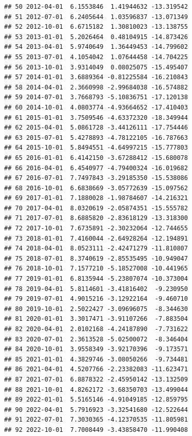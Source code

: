 \documentclass[
]{article}
\newenvironment{Shaded}{\begin{snugshade}}{\end{snugshade}}
\newcommand{\AttributeTok}[1]{\textcolor[rgb]{0.77,0.63,0.00}{#1}}
\newcommand{\FunctionTok}[1]{\textcolor[rgb]{0.00,0.00,0.00}{#1}}
\newcommand{\NormalTok}[1]{#1}
\newcommand{\SpecialCharTok}[1]{\textcolor[rgb]{0.00,0.00,0.00}{#1}}
\newcommand{\StringTok}[1]{\textcolor[rgb]{0.31,0.60,0.02}{#1}}
\begin{document}
\begin{verbatim}
## 50 2012-04-01  6.1553846  1.41944632 -13.319542
## 51 2012-07-01  6.2405644  1.03596837 -13.071349
## 52 2012-10-01  6.6715182  1.30810023 -13.138755
## 53 2013-01-01  5.2026464  0.48104915 -14.873426
## 54 2013-04-01  5.9740649  1.36449453 -14.799602
## 55 2013-07-01  4.1054042  1.07644458 -14.704225
## 56 2013-10-01  3.9314049  0.08025075 -15.495407
## 57 2014-01-01  3.6889364 -0.81225584 -16.210843
## 58 2014-04-01  2.3660998 -2.99684038 -16.574882
## 59 2014-07-01  3.7668793 -5.10836751 -17.120138
## 60 2014-10-01  4.0803774 -4.93664652 -17.410403
## 61 2015-01-01  3.7509546 -4.63372320 -18.349944
## 62 2015-04-01  5.0861728 -3.44126111 -17.754446
## 63 2015-07-01  5.4278893 -4.78122105 -16.787663
## 64 2015-10-01  5.8494551 -4.64997215 -15.777803
## 65 2016-01-01  6.4142150 -3.67288412 -15.680078
## 66 2016-04-01  6.4540977 -4.79400324 -16.019682
## 67 2016-07-01  7.7497843 -3.29185350 -15.538086
## 68 2016-10-01  6.6838669 -3.05772639 -15.097562
## 69 2017-01-01  7.1880028 -1.98784607 -14.216321
## 70 2017-04-01  8.0320619 -2.05874351 -15.555782
## 71 2017-07-01  8.6885820 -2.83618129 -13.318300
## 72 2017-10-01  7.6735891 -2.30232064 -12.744655
## 73 2018-01-01  7.4160044 -2.64928264 -12.194891
## 74 2018-04-01  8.0523111 -2.42471279 -11.810807
## 75 2018-07-01  8.3740619 -2.85535495 -10.949047
## 76 2018-10-01  7.1577210 -5.18527008 -10.441965
## 77 2019-01-01  6.8135944 -5.23807074 -10.373004
## 78 2019-04-01  5.8114601 -3.41816402  -9.230950
## 79 2019-07-01  4.9015216 -3.12922164  -9.460710
## 80 2019-10-01  2.5022427 -3.09696075  -8.344630
## 81 2020-01-01  3.3017471 -3.91107266  -7.883504
## 82 2020-04-01  2.0102168 -4.24187890  -7.731622
## 83 2020-07-01  2.3613528 -5.02500072  -8.346404
## 84 2020-10-01  3.9558349 -3.92170396  -9.173571
## 85 2021-01-01  4.3829746 -3.08050266  -9.734481
## 86 2021-04-01  4.5207766 -2.23382083 -11.623471
## 87 2021-07-01  6.8878322 -2.45950142 -13.132509
## 88 2021-10-01  4.8262172 -3.68350703 -13.499044
## 89 2022-01-01  5.5165146 -4.91049185 -12.859795
## 90 2022-04-01  5.7916923 -3.32541680 -12.522644
## 91 2022-07-01  7.3030365 -4.12370535 -11.805981
## 92 2022-10-01  7.7008449 -3.43858470 -11.990408
\end{verbatim}

\begin{Shaded}
\end{Shaded}
\end{document}
